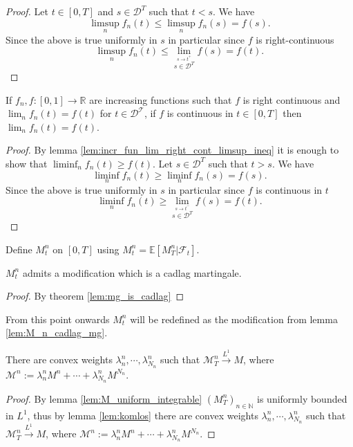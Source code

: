 \begin{proof}
  Let $t\in[0,T]$ and $s\in\mathcal{D}^T$ such that $t<s$. We have
  $$
  \limsup_n f_n(t)\leq \limsup_n f_n(s)=f(s).
  $$
  Since the above is true uniformly in $s$ in particular since $f$ is right-continuous
  $$
  \limsup_n f_n(t)\leq\lim_{\stackrel{s\rightarrow t^+}{s\in\mathcal{D}^T}}f(s)=f(t).
  $$
\end{proof}


\begin{lemma}\label{lem:incr_fun_lim_right_cont_lim_eq}
  If $f_n, f : [0, 1] \rightarrow \mathbb{R}$ are increasing functions such that $f$ is right continuous and
  $\lim_n f_n(t) = f (t)$ for $t \in\mathcal{D^T}$, if $f$ is continuous in $t\in[0,T]$ then $\lim_n  f_n(t) = f (t)$.
\end{lemma}

\begin{proof}
  By lemma \ref{lem:incr_fun_lim_right_cont_limsup_ineq} it is enough to show that $\liminf_n f_n(t)\geq f(t)$.
  Let $s\in\mathcal{D}^T$ such that $t>s$. We have
  $$
  \liminf_n f_n(t)\geq \liminf_n f_n(s)=f(s).
  $$
  Since the above is true uniformly in $s$ in particular since $f$ is continuous in $t$
  $$
  \liminf_n f_n(t)\geq\lim_{\stackrel{s\rightarrow t^-}{s\in\mathcal{D}^T}}f(s)=f(t).
$$
\end{proof}

Define $M^n_t$ on $[0,T]$ using $M^n_t=\mathbb{E}[M^n_T\vert\mathcal{F}_t]$.

\begin{lemma}\label{lem:M_n_cadlag_mg}
  $M^n_t$ admits a modification which is a cadlag martingale.
\end{lemma}

\begin{proof}
  By theorem \ref{lem:mg_is_cadlag}
\end{proof}

From this point onwards $M^n_t$ will be redefined as the modification from lemma \ref{lem:M_n_cadlag_mg}.

\begin{lemma}\label{lem:M_cal_converges_L1}
  There are convex weights $\lambda^n_n,\cdots,\lambda^n_{N_n}$ such that
  $\mathcal{M}^n_T\stackrel{L^1}{\rightarrow}M$, where $\mathcal{M}^n:=\lambda^n_nM^n+\cdots +\lambda^n_{N_n}M^{N_n}.$
\end{lemma}
\begin{proof}
  By lemma \ref{lem:M_uniform_integrable} $(M^n_T)_{n\in\mathbb{N}}$ is uniformly bounded in $L^1$, thus by lemma \ref{lem:komlos} there are convex weights $\lambda^n_n,\cdots,\lambda^n_{N_n}$ such that
  $\mathcal{M}^n_T\stackrel{L^1}{\rightarrow}M$, where $\mathcal{M}^n:=\lambda^n_nM^n+\cdots +\lambda^n_{N_n}M^{N_n}.$
\end{proof}

